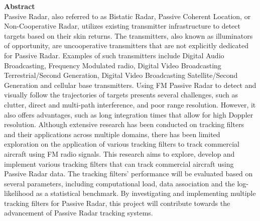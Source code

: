 \vspace*{3cm}
\noindent \large \textbf{\Huge Abstract}
\\[1.5cm]
Passive Radar, also referred to as Bistatic Radar, Passive Coherent Location, or Non-Cooperative Radar, utilizes existing transmitter infrastructure to detect targets based on their skin returns. The transmitters, also known as illuminators of opportunity, are uncooperative transmitters that are not explicitly dedicated for Passive Radar. Examples of such transmitters include Digital Audio Broadcasting, Frequency Modulated radio, Digital Video Broadcasting Terrestrial/Second Generation, Digital Video Broadcasting Satellite/Second Generation and cellular base transmitters.
\newline
\newline
Using FM Passive Radar to detect and visually follow the trajectories of targets presents several challenges, such as clutter, direct and multi-path interference, and poor range resolution. However, it also offers advantages, such as long integration times that allow for high Doppler resolution. Although extensive research has been conducted on tracking filters and their applications across multiple domains, there has been limited exploration on the application of various tracking filters to track commercial aircraft using FM radio signals.
\newline
\newline
 This research aims to explore, develop and implement various tracking filters that can track commercial aircraft using  Passive Radar data. The tracking filters' performance will be evaluated based on several parameters, including computational load, data association and the log-likelihood as a statistical benchmark. By investigating and implementing multiple tracking filters for Passive Radar, this project will contribute towards the advancement of Passive Radar tracking systems.